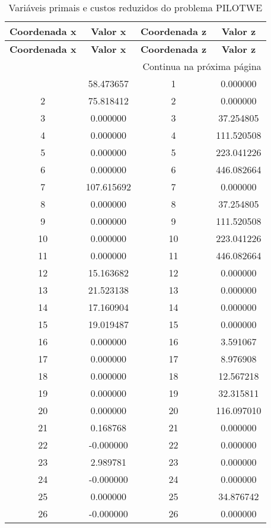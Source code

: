 \documentclass[12pt]{article}
\begin{document}
\begin{longtable}{@{}cccc@{}}
\caption{Variáveis primais e custos reduzidos do problema PILOTWE} \\
\toprule
\textbf{Coordenada x} & \textbf{Valor x} & \textbf{Coordenada z} & \textbf{Valor z} \\
\midrule
\endfirsthead

\toprule
\textbf{Coordenada x} & \textbf{Valor x} & \textbf{Coordenada z} & \textbf{Valor z} \\
\midrule
\endhead

\midrule \multicolumn{4}{r}{{Continua na próxima página}} \\ \midrule
\endfoot

\bottomrule
\endlastfoot
1 & 58.473657 & 1 & 0.000000 \\
2 & 75.818412 & 2 & 0.000000 \\
3 & 0.000000 & 3 & 37.254805 \\
4 & 0.000000 & 4 & 111.520508 \\
5 & 0.000000 & 5 & 223.041226 \\
6 & 0.000000 & 6 & 446.082664 \\
7 & 107.615692 & 7 & 0.000000 \\
8 & 0.000000 & 8 & 37.254805 \\
9 & 0.000000 & 9 & 111.520508 \\
10 & 0.000000 & 10 & 223.041226 \\
11 & 0.000000 & 11 & 446.082664 \\
12 & 15.163682 & 12 & 0.000000 \\
13 & 21.523138 & 13 & 0.000000 \\
14 & 17.160904 & 14 & 0.000000 \\
15 & 19.019487 & 15 & 0.000000 \\
16 & 0.000000 & 16 & 3.591067 \\
17 & 0.000000 & 17 & 8.976908 \\
18 & 0.000000 & 18 & 12.567218 \\
19 & 0.000000 & 19 & 32.315811 \\
20 & 0.000000 & 20 & 116.097010 \\
21 & 0.168768 & 21 & 0.000000 \\
22 & -0.000000 & 22 & 0.000000 \\
23 & 2.989781 & 23 & 0.000000 \\
24 & -0.000000 & 24 & 0.000000 \\
25 & 0.000000 & 25 & 34.876742 \\
26 & -0.000000 & 26 & 0.000000 \\

\end{longtable}
\end{document}
